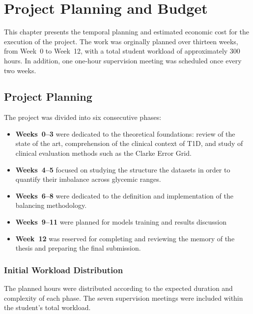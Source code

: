 
\chapter{Project Planning and Budget}
\label{chap:planning_budget}

This chapter presents the temporal planning and estimated economic cost for the execution of the project. The work was orginally planned over thirteen weeks, from Week~0 to Week~12, with a total student workload of approximately 300 hours. In addition, one one-hour supervision meeting was scheduled once every two weeks.

\section{Project Planning}
\label{sec:project_planning}

The project was divided into six consecutive phases:

\begin{itemize}
    \item \textbf{Weeks~0--3} were dedicated to the theoretical foundations: review of the state of the art, comprehension of the clinical context of T1D, and study of clinical evaluation methods such as the Clarke Error Grid.
    \item \textbf{Weeks~4--5} focused on studying the structure the datasets in order to quantify their imbalance across glycemic ranges.
    \item \textbf{Weeks~6--8} were dedicated to the definition and implementation of the balancing methodology.
    \item \textbf{Weeks~9--11} were planned for models training and results discussion
    \item \textbf{Week~12} was reserved for completing and reviewing the memory of the thesis and preparing the final submission.
\end{itemize} 

\subsection{Initial Workload Distribution}
\label{subsec:initial_workload}

The planned hours were distributed according to the expected duration and complexity of each phase. The seven supervision meetings were included within the student's total workload.

